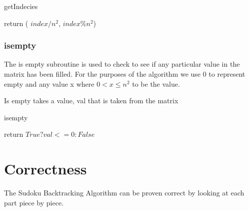 \documentclass{sig-alternate}
\begin{document}
\begin{algorithm}[H]
\caption{getIndecies}\label{getIndecies}
\begin{algorithmic}[1]

\State return ( $index / n^2$, $index \% n^2$)

\EndProcedure
\end{algorithmic}
\end{algorithm}


\subsubsection{isempty}

The is empty subroutine is used to check to see if any particular value in the matrix has been filled. 
For the purposes of the algorithm we use 0 to represent empty and any value x where $0 < x \le n^2$ to be the value.

Is empty takes a value, val that is taken from the matrix

\begin{algorithm}[H]
\caption{isempty}\label{isempty}
\begin{algorithmic}[1]

\State return $True ? val <= 0 : False$
\EndProcedure
\end{algorithmic}
\end{algorithm}


\section{Correctness}
The Sudoku Backtracking Algorithm can be proven correct by looking at each part piece by piece.
\end{document}
